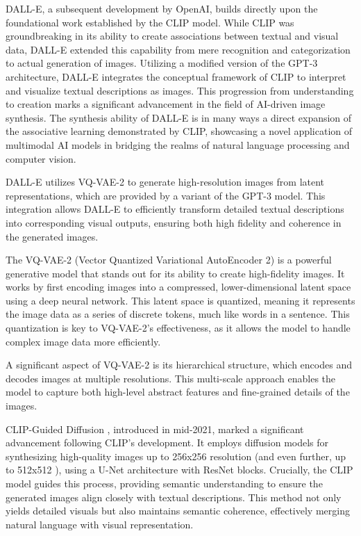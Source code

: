 \documentclass[12pt, letterpaper]{article}
\begin{document}
DALL-E, a subsequent development by OpenAI, builds directly upon the foundational work established by the CLIP model. While CLIP was groundbreaking in its ability to create associations between textual and visual data, DALL-E \cite{ramesh2021zeroshot} extended this capability from mere recognition and categorization to actual generation of images. Utilizing a modified version of the GPT-3 \cite{brown2020language} architecture, DALL-E integrates the conceptual framework of CLIP to interpret and visualize textual descriptions as images. This progression from understanding to creation marks a significant advancement in the field of AI-driven image synthesis. The synthesis ability of DALL-E is in many ways a direct expansion of the associative learning demonstrated by CLIP, showcasing a novel application of multimodal AI models in bridging the realms of natural language processing and computer vision.

DALL-E utilizes VQ-VAE-2 \cite{razavi2019generating} to generate high-resolution images from latent representations, which are provided by a variant of the GPT-3 model. This integration allows DALL-E to efficiently transform detailed textual descriptions into corresponding visual outputs, ensuring both high fidelity and coherence in the generated images.

The VQ-VAE-2 (Vector Quantized Variational AutoEncoder 2) is a powerful generative model that stands out for its ability to create high-fidelity images. It works by first encoding images into a compressed, lower-dimensional latent space using a deep neural network. This latent space is quantized, meaning it represents the image data as a series of discrete tokens, much like words in a sentence. This quantization is key to VQ-VAE-2's effectiveness, as it allows the model to handle complex image data more efficiently.

A significant aspect of VQ-VAE-2 is its hierarchical structure, which encodes and decodes images at multiple resolutions. This multi-scale approach enables the model to capture both high-level abstract features and fine-grained details of the images. 

CLIP-Guided Diffusion \cite{crowson2021clip}, introduced in mid-2021, marked a significant advancement following CLIP's development. It employs diffusion models \cite{nichol2021improved} for synthesizing high-quality images up to 256x256 resolution (and even further, up to 512x512 \cite{crowson2021clip512}), using a U-Net architecture with ResNet blocks. Crucially, the CLIP model guides this process, providing semantic understanding to ensure the generated images align closely with textual descriptions. This method not only yields detailed visuals but also maintains semantic coherence, effectively merging natural language with visual representation.
\end{document}
